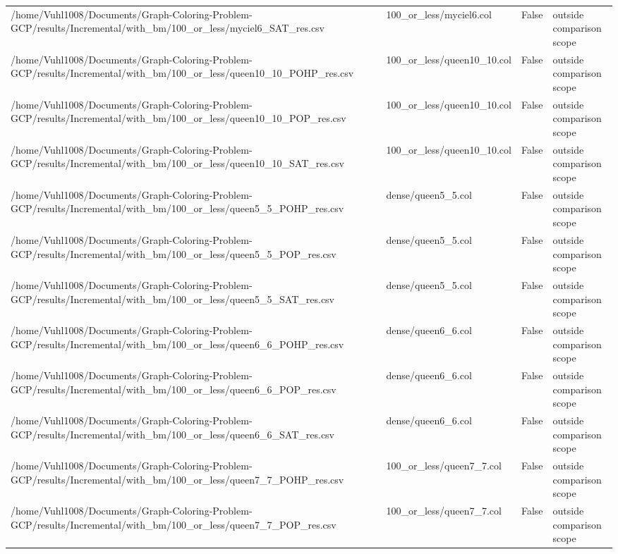\begin{table}[htbp]
\begin{tabular}{llll}
/home/Vuhl1008/Documents/Graph-Coloring-Problem-GCP/results/Incremental/with\_bm/100\_or\_less/myciel6\_SAT\_res.csv & 100\_or\_less/myciel6.col & False & outside comparison scope \\
/home/Vuhl1008/Documents/Graph-Coloring-Problem-GCP/results/Incremental/with\_bm/100\_or\_less/queen10\_10\_POHP\_res.csv & 100\_or\_less/queen10\_10.col & False & outside comparison scope \\
/home/Vuhl1008/Documents/Graph-Coloring-Problem-GCP/results/Incremental/with\_bm/100\_or\_less/queen10\_10\_POP\_res.csv & 100\_or\_less/queen10\_10.col & False & outside comparison scope \\
/home/Vuhl1008/Documents/Graph-Coloring-Problem-GCP/results/Incremental/with\_bm/100\_or\_less/queen10\_10\_SAT\_res.csv & 100\_or\_less/queen10\_10.col & False & outside comparison scope \\
/home/Vuhl1008/Documents/Graph-Coloring-Problem-GCP/results/Incremental/with\_bm/100\_or\_less/queen5\_5\_POHP\_res.csv & dense/queen5\_5.col & False & outside comparison scope \\
/home/Vuhl1008/Documents/Graph-Coloring-Problem-GCP/results/Incremental/with\_bm/100\_or\_less/queen5\_5\_POP\_res.csv & dense/queen5\_5.col & False & outside comparison scope \\
/home/Vuhl1008/Documents/Graph-Coloring-Problem-GCP/results/Incremental/with\_bm/100\_or\_less/queen5\_5\_SAT\_res.csv & dense/queen5\_5.col & False & outside comparison scope \\
/home/Vuhl1008/Documents/Graph-Coloring-Problem-GCP/results/Incremental/with\_bm/100\_or\_less/queen6\_6\_POHP\_res.csv & dense/queen6\_6.col & False & outside comparison scope \\
/home/Vuhl1008/Documents/Graph-Coloring-Problem-GCP/results/Incremental/with\_bm/100\_or\_less/queen6\_6\_POP\_res.csv & dense/queen6\_6.col & False & outside comparison scope \\
/home/Vuhl1008/Documents/Graph-Coloring-Problem-GCP/results/Incremental/with\_bm/100\_or\_less/queen6\_6\_SAT\_res.csv & dense/queen6\_6.col & False & outside comparison scope \\
/home/Vuhl1008/Documents/Graph-Coloring-Problem-GCP/results/Incremental/with\_bm/100\_or\_less/queen7\_7\_POHP\_res.csv & 100\_or\_less/queen7\_7.col & False & outside comparison scope \\
/home/Vuhl1008/Documents/Graph-Coloring-Problem-GCP/results/Incremental/with\_bm/100\_or\_less/queen7\_7\_POP\_res.csv & 100\_or\_less/queen7\_7.col & False & outside comparison scope \\

\end{tabular}
\end{table}
